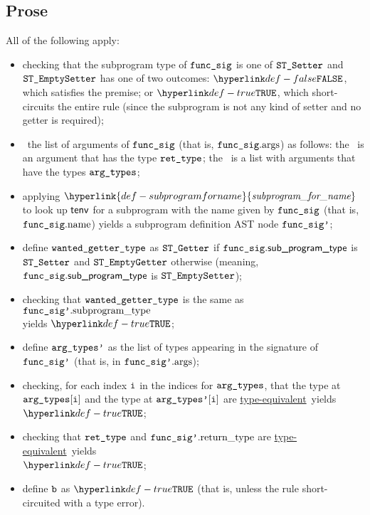 \documentclass{book}
\newcommand\ProseOrTypeError[0]{\ProseTerminateAs{\TypeErrorConfig}}
\newcommand\typeequivalent[0]{\hyperlink{def-typeequal}{type-equivalent}}
\newcommand\subprogramforname[0]{\hyperlink{def-subprogramforname}{\textfunc{subprogram\_for\_name}}}
\begin{document}
\subsection{Prose}
All of the following apply:
\begin{itemize}
  \item checking that the subprogram type of $\texttt{func\_sig}$ is one of $\texttt{ST\_Setter}$ and \\ $\texttt{ST\_EmptySetter}$
        has one of two outcomes:
        $\False$, which satisfies the premise;
        or $\True$, which short-circuits the entire rule
        (since the subprogram is not any kind of setter and no getter is required);
  \item \view\ the list of arguments of $\texttt{func\_sig}$ (that is, $\texttt{func\_sig}.\text{args}$) as follows:
        the \head\ is an argument that has the type $\texttt{ret\_type}$;
        the \tail\ is a list with arguments that have the types $\texttt{arg\_types}$;
  \item applying $\subprogramforname$ to look up $\textsf{tenv}$ for a subprogram with the name given by $\texttt{func\_sig}$ (that is, $\texttt{func\_sig}.\text{name}$)
        yields a subprogram definition AST node $\texttt{func\_sig'}$\ProseOrTypeError;
  \item define $\texttt{wanted\_getter\_type}$ as $\texttt{ST\_Getter}$ if $\texttt{func\_sig}.\textsf{sub\_program\_type}$ is \\ $\texttt{ST\_Setter}$ and
        $\texttt{ST\_EmptyGetter}$ otherwise (meaning, $\texttt{func\_sig}.\textsf{sub\_program\_type}$ is $\texttt{ST\_EmptySetter}$);
  \item checking that $\texttt{wanted\_getter\_type}$ is the same as $\texttt{func\_sig'}.\text{subprogram\_type}$ \\ yields $\True$\ProseOrTypeError;
  \item define $\texttt{arg\_types'}$ as the list of types appearing in the signature of $\texttt{func\_sig'}$ (that is, in $\texttt{func\_sig'}.\text{args}$);
  \item checking, for each index $\texttt{i}$ in the indices for $\texttt{arg\_types}$, that the type at $\texttt{arg\_types}[\texttt{i}]$ and the type at $\texttt{arg\_types'}[\texttt{i}]$
        are \typeequivalent\ yields $\True$\ProseOrTypeError;
  \item checking that $\texttt{ret\_type}$ and $\texttt{func\_sig'}.\text{return\_type}$ are \typeequivalent\ yields \\
        $\True$\ProseOrTypeError;
  \item define $\texttt{b}$ as $\True$ (that is, unless the rule short-circuited with a type error).
\end{itemize}

\end{document}
